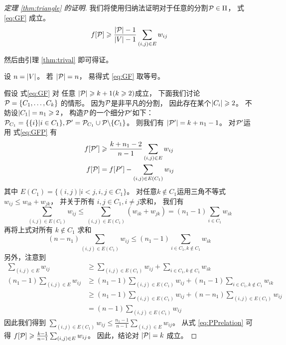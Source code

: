   \begin{proof}[定理 \ref{thm:triangle} 的证明]
    我们将使用归纳法证明对于任意的分割$\P \in \Pi$，
    式\eqref{eq:GF} 成立。
    \begin{equation}\label{eq:GF}
    f[\P] \geq \frac{\abs{\P}-1}{\abs{V}-1} \sum_{(i,j) \in E} w_{ij}
    \end{equation}
    
    然后由引理 \ref{thm:trival} 
    即可得证。
    
    设 $n=\abs{V}$。
    若 $\abs{\P}=n$，
    易得式 \eqref{eq:GF} 取等号。
    
    假设 式\eqref{eq:GF} 对 任意
    $\abs{\P} \geq k+1(k\geq 2)$成立，
    下面我们讨论 $\P=\{C_1, \dots, C_k\}$
    的情形。
    因为$\P$是非平凡的分割，
    因此存在某个$\abs{C_i}\geq 2$。
    不妨设$\abs{C_1}=n_1\geq 2$，
    构造$\P$的一个细分$\P'$如下：
    $\P_{C_1} = \{\{i\}| i \in C_1\}, \P'=\P_{C_1} \cup \P \backslash \{C_1\}$。
    则我们有 $\abs{\P'} = k+n_1-1$。
    对$\P'$运用 式\eqref{eq:GFP} 有
    \begin{align}\label{eq:PPrelation}
    f[\P'] &
    \geq \frac{k+n_1 -2}{n-1}\sum_{(i,j) \in E} w_{ij} \\
    f[\P] & =f[P'] - \sum_{(i,j) \in E(C_1)} w_{ij}
    \end{align}
    其中
    $E(C_1) =\{ (i,j) |i<j, i, j\in C_1 \}$。
    对任意$k \not\in C_1$运用三角不等式
    $w_{ij} \leq w_{ik} + w_{jk}$，
    并关于所有 $i, j \in C_1, i\neq j$求和，
    我们有
    $$
    \sum_{(i,j) \in E(C_1)} w_{ij} \leq \sum_{(i,j) \in E(C_1)} (w_{ik} + w_{jk}) = (n_1-1)\sum_{i\in C_1} w_{ik}
    $$
    再将上式对所有 $k \not\in C_1$ 求和
    $$
    (n - n_1) \sum_{(i,j) \in E(C_1)} w_{ij} \leq (n_1 - 1) \sum_{i \in C_1, k \not\in C_1} w_{ik}
    $$
    另外，注意到
    \begin{align*}
    \sum_{(i,j) \in E} w_{ij}  & \geq \sum_{(i,j) \in E(C_1)} w_{ij} + \sum_{i\in C_1, k\not\in C_1} w_{ik} \\
    (n_1 - 1)\sum_{(i,j) \in E} w_{ij}  & \geq (n_1 -1 )\sum_{(i,j) \in E(C_1)} w_{ij} + (n_1-1)\sum_{i\in C_1, k\not\in C_1} w_{ik} \\
    & \geq (n_1 -1 )\sum_{(i,j) \in E(C_1)} w_{ij} + (n - n_1) \sum_{(i,j) \in E(C_1)} w_{ij}\\
    & = (n-1) \sum_{(i,j) \in E(C_1)} w_{ij}
    \end{align*}
   因此我们得到 $\sum_{(i,j) \in E(C_1)} w_{ij} \leq \frac{n_1-1}{n-1}\sum_{(i,j) \in E} w_{ij}$。
   从式 \eqref{eq:PPrelation} 可得
    $f[\P] \geq \frac{k-1}{n-1}\sum_{(i,j) \in E} w_{ij}$。
    因此，结论对 $\abs{\P}=k$ 成立。
    \end{proof}
